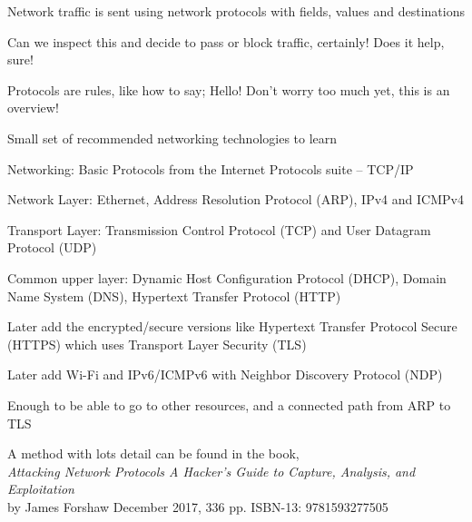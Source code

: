 \documentclass[Screen16to9,17pt]{foils}
\begin{document}



\begin{list2}
\item Network traffic is sent using network protocols with fields, values and destinations
\item Can we inspect this and decide to pass or block traffic, certainly! Does it help, sure!
\end{list2}




Protocols are rules, like how to say; Hello!
Don't worry too much yet, this is an overview!



Small set of recommended networking technologies to learn

Networking: Basic Protocols from the Internet Protocols suite -- TCP/IP
\begin{list2}
\item Network Layer: Ethernet, Address Resolution Protocol (ARP), IPv4 and ICMPv4
\item Transport Layer: Transmission Control Protocol (TCP) and User Datagram Protocol (UDP)
\item Common upper layer: Dynamic Host Configuration Protocol (DHCP), Domain Name System (DNS),
Hypertext Transfer Protocol (HTTP)\\
\vskip 5mm
\item Later add the encrypted/secure versions like Hypertext Transfer Protocol Secure (HTTPS) which uses Transport Layer Security (TLS)
\item Later add Wi-Fi and IPv6/ICMPv6 with Neighbor Discovery Protocol (NDP)
\end{list2}

Enough to be able to go to other resources, and a connected path from ARP to TLS





A method with lots detail can be found in the book,\\
\emph{Attacking Network Protocols A Hacker's Guide to Capture, Analysis, and Exploitation}\\
by James Forshaw December 2017, 336 pp. ISBN-13: 9781593277505
\end{document}
